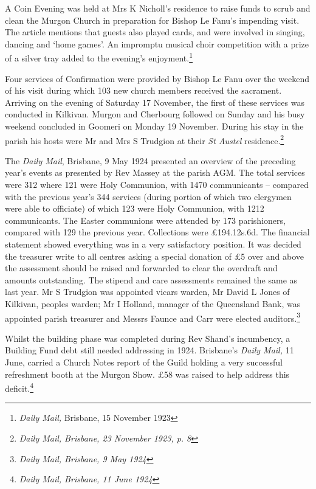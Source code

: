 A Coin Evening was held at Mrs K Nicholl's residence to raise funds to scrub and clean the Murgon Church in preparation for Bishop Le Fanu's impending visit. The article mentions that guests also played cards, and were involved in singing, dancing and `home games'. An impromptu musical choir competition with a prize of a silver tray added to the evening's enjoyment.\footnote{\emph{Daily Mail,} Brisbane, 15 November 1923}


Four services of Confirmation were provided by Bishop Le Fanu over the weekend of his visit during which 103 new church members received the sacrament. Arriving on the evening of Saturday 17 November, the first of these services was conducted in Kilkivan. Murgon and Cherbourg followed on Sunday and his busy weekend concluded in Goomeri on Monday 19 November. During his stay in the parish his hosts were Mr and Mrs S Trudgion at their \emph{St Austel} residence.\footnote{\emph{Daily Mail, Brisbane, 23 November 1923, p. 8}}


The \emph{Daily Mail}, Brisbane, 9 May 1924 presented an overview of the preceding year's events as presented by Rev Massey at the parish AGM. The total services were 312 where 121 were Holy Communion, with 1470 communicants -- compared with the previous year's 344 services (during portion of which two clergymen were able to officiate) of which 123 were Holy Communion, with 1212 communicants. The Easter communions were attended by 173 parishioners, compared with 129 the previous year. Collections were \pounds194.12s.6d. The financial statement showed everything was in a very satisfactory position. It was decided the treasurer write to all centres asking a special donation of \pounds5 over and above the assessment should be raised and forwarded to clear the overdraft and amounts outstanding. The stipend and care assessments remained the same as last year. Mr S Trudgion was appointed vicars warden, Mr David L Jones of Kilkivan, peoples warden; Mr I Holland, manager of the Queensland Bank, was appointed parish treasurer and Messrs Faunce and Carr were elected auditors.\footnote{\emph{Daily Mail, Brisbane, 9 May 1924}}


Whilst the building phase was completed during Rev Shand's incumbency, a Building Fund debt still needed addressing in 1924. Brisbane's \emph{Daily Mail,} 11 June, carried a Church Notes report of the Guild holding a very successful refreshment booth at the Murgon Show. \pounds58 was raised to help address this deficit.\footnote{\emph{Daily Mail, Brisbane, 11 June 1924}}


